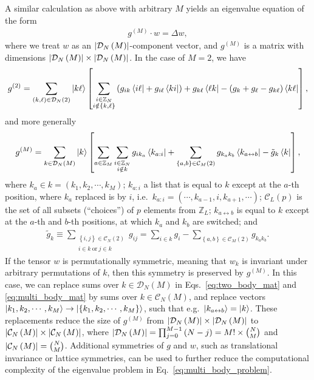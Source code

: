 \documentclass[aps,pra,nofootinbib,twocolumn,superscriptaddress]{revtex4-2}
\renewcommand{\t}{\text} %
\newcommand{\p}[1]{\left(#1\right)} %
\renewcommand{\sp}[1]{\left[#1\right]} %
\renewcommand{\set}[1]{\left\{#1\right\}} %
\renewcommand{\i}{\mathrm{i}\mkern1mu} %
\newcommand{\1}{\mathds{1}}
\newcommand{\ZZ}{\mathbb{Z}}
\newcommand{\C}{\mathcal{C}}
\newcommand{\D}{\mathcal{D}}
\begin{document}
A similar calculation as above with arbitrary $M$ yields an eigenvalue equation of the form
\begin{align}
  g^{(M)} \cdot w = \Delta w,
  \label{eq:multi_body_problem}
\end{align}
where we treat $w$ as an $\abs{\D_N\p{M}}$-component vector, and $g^{(M)}$ is a matrix with dimensions $\abs{\D_N\p{M}}\times\abs{\D_N\p{M}}$.
In the case of $M=2$, we have
\begin{align}
  g^{(2)} = \sum_{\p{k,\ell}\in\D_N\p{2}} \ket{k\ell}
  \sp{\sum_{\substack{i\in\ZZ_N\\i\notin\set{k,\ell}}}
    \p{ g_{ik} \bra{i\ell} + g_{i\ell} \bra{ki} }
    + g_{k\ell} \bra{\ell k}
    - \p{g_k + g_\ell - g_{k\ell}} \bra{k\ell}},
  \label{eq:two_body_mat}
\end{align}
and more generally
\begin{align}
  g^{(M)} = \sum_{k\in\D_N\p{M}} \ket{k}
  \sp{\sum_{a\in\ZZ_M} \sum_{\substack{i\in\ZZ_N\\i\notin k}}
    g_{ik_a} \bra{k_{a:i}}
    + \sum_{\set{a,b}\in\C_M\p{2}} g_{k_ak_b} \bra{k_{a\leftrightarrow b}}
    - \tilde g_k \bra{k}},
  \label{eq:multi_body_mat}
\end{align}
where $k_a\in k=\p{k_1,k_2,\cdots,k_M}$; $k_{a:i}$ a list that is equal to $k$ except at the $a$-th position, where $k_a$ replaced is by $i$, i.e.~$k_{a:i}=\p{\cdots,k_{a-1},i,k_{a+1},\cdots}$; $\C_L\p{p}$ is the set of all subsets (``choices'') of $p$ elements from $\ZZ_L$; $k_{a\leftrightarrow b}$ is equal to $k$ except at the $a$-th and $b$-th positions, at which $k_a$ and $k_b$ are switched; and
\begin{align}
  \tilde g_k
  \equiv \sum_{\substack{\set{i,j}\in\C_N\p{2}\\i\in k~\t{or}~j\in k}} g_{ij}
  = \sum_{i\in k} g_i - \sum_{\set{a,b}\in\C_M\p{2}} g_{k_ak_b}.
\end{align}
If the tensor $w$ is permutationally symmetric, meaning that $w_k$ is invariant under arbitrary permutations of $k$, then this symmetry is preserved by $g^{(M)}$.
In this case, we can replace sums over $k\in\D_N\p{M}$ in Eqs.~\eqref{eq:two_body_mat} and \eqref{eq:multi_body_mat} by sums over $k\in\C_N\p{M}$, and replace vectors $\ket{k_1,k_2,\cdots,k_M}\to\ket{\set{k_1,k_2,\cdots,k_M}}$, such that e.g.~$\ket{k_{a\leftrightarrow b}}=\ket{k}$.
These replacements reduce the size of $g^{(M)}$ from $\abs{\D_N\p{M}}\times\abs{\D_N\p{M}}$ to $\abs{\C_N\p{M}}\times\abs{\C_N\p{M}}$, where $\abs{\D_N\p{M}}=\prod_{j=0}^{M-1}\p{N-j}=M!\times{N\choose M}$ and $\abs{\C_N\p{M}}={N\choose M}$.
Additional symmetries of $g$ and $w$, such as translational invariance or lattice symmetries, can be used to further reduce the computational complexity of the eigenvalue problem in Eq.~\eqref{eq:multi_body_problem}.
\end{document}
